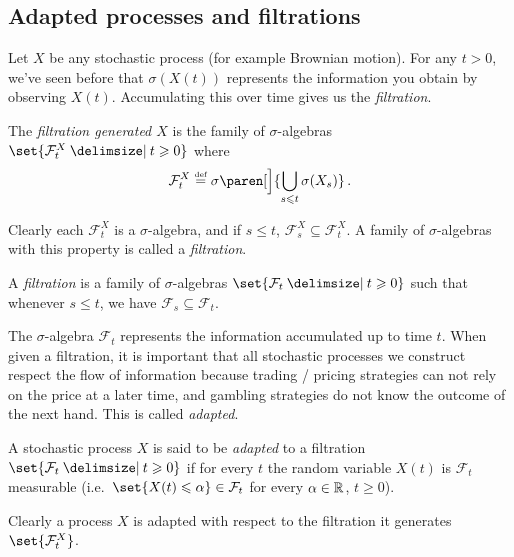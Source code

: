 \subsection{Adapted processes and filtrations}

Let $X$ be any stochastic process (for example Brownian motion).
For any $t > 0$, we've seen before that $\sigma(X(t))$ represents the information you obtain by observing $X(t)$.
Accumulating this over time gives us the \emph{filtration}.

\begin{definition}
  The \emph{filtration generated $X$} is the family of $\sigma$-algebras $\set{\mathcal F^X_t \st t \geq 0}$ where
  \begin{equation*}
    \mathcal F_t^X \defeq \sigma\paren[\Big]{ \bigcup_{s \leq t} \sigma(X_s) }
    \,.
  \end{equation*}
\end{definition}

Clearly each $\mathcal F_t^X$ is a $\sigma$-algebra, and if $s \leq t$, $\mathcal F^X_s \subseteq \mathcal F^X_t$.
A family of $\sigma$-algebras with this property is called a \emph{filtration}.

\begin{definition}
  A \emph{filtration} is a family of $\sigma$-algebras $\set{ \mathcal F_t \st t \geq 0}$ such that whenever $s \leq t$, we have $\mathcal F_s \subseteq \mathcal F_t$.
\end{definition}

The $\sigma$-algebra $\mathcal F_t$ represents the information accumulated up to time $t$.
When given a filtration, it is important that all stochastic processes we construct respect the flow of information because trading / pricing strategies can not rely on the price at a later time, and gambling strategies do not know the outcome of the next hand.
This is called \emph{adapted}.

\begin{definition}
  A stochastic process $X$ is said to be \emph{adapted} to a filtration $\set{\mathcal F_t \st t \geq 0}$ if for every $t$ the random variable $X(t)$ is $\mathcal F_t$ measurable (i.e.\ $\set{X(t) \leq \alpha} \in \mathcal F_t$ for every $\alpha \in \mathbb{R}$, $t \geq 0$).
\end{definition}

Clearly a process $X$ is adapted with respect to the filtration it generates $\set{\mathcal F_t^X}$.

